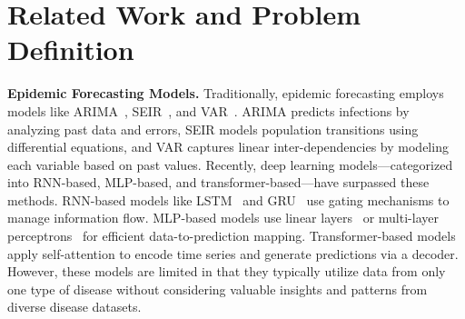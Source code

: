 \section{Related Work and Problem Definition}
\textbf{Epidemic Forecasting Models.}
Traditionally, epidemic forecasting employs models like ARIMA~\cite{sahai2020arima}, SEIR~\cite{he2020seir}, and VAR~\cite{shang2021regional}. ARIMA predicts infections by analyzing past data and errors, SEIR models population transitions using differential equations, and VAR captures linear inter-dependencies by modeling each variable based on past values. Recently, deep learning models—categorized into RNN-based, MLP-based, and transformer-based—have surpassed these methods. RNN-based models like LSTM~\cite{wang2020time} and GRU~\cite{natarajan2023outbreak} use gating mechanisms to manage information flow. MLP-based models use linear layers~\cite{zeng2023transformers} or multi-layer perceptrons~\cite{borghi2021covid,madden2024deep} for efficient data-to-prediction mapping. Transformer-based models~\cite{wu2021autoformer, zhou2021informer, zhou2022fedformer} apply self-attention to encode time series and generate predictions via a decoder. However, these models are limited in that they typically utilize data from only one type of disease without considering valuable insights and patterns from diverse disease datasets.




